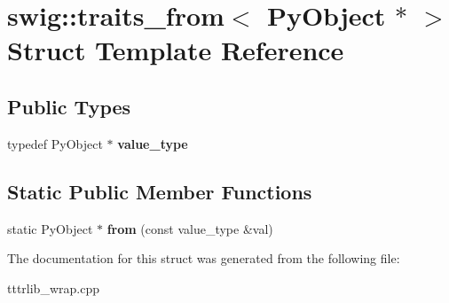 \hypertarget{structswig_1_1traits__from_3_01_py_object_01_5_01_4}{}\section{swig\+:\+:traits\+\_\+from$<$ Py\+Object $\ast$ $>$ Struct Template Reference}
\label{structswig_1_1traits__from_3_01_py_object_01_5_01_4}
\subsection*{Public Types}
\begin{DoxyCompactItemize}
\item 
\mbox{\label{structswig_1_1traits__from_3_01_py_object_01_5_01_4_a3f736b20ca687eb0894c64d1b8ec2b11}} 
typedef Py\+Object $\ast$ {\bfseries value\+\_\+type}
\end{DoxyCompactItemize}
\subsection*{Static Public Member Functions}
\begin{DoxyCompactItemize}
\item 
\mbox{\label{structswig_1_1traits__from_3_01_py_object_01_5_01_4_ab383a520e9f35b0d778819da07efd42d}} 
static Py\+Object $\ast$ {\bfseries from} (const value\+\_\+type \&val)
\end{DoxyCompactItemize}


The documentation for this struct was generated from the following file\+:\begin{DoxyCompactItemize}
\item 
tttrlib\+\_\+wrap.\+cpp\end{DoxyCompactItemize}

